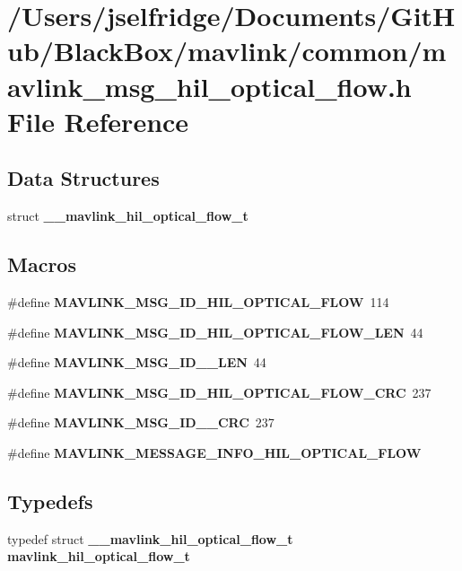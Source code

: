 \section{/\+Users/jselfridge/\+Documents/\+Git\+Hub/\+Black\+Box/mavlink/common/mavlink\+\_\+msg\+\_\+hil\+\_\+optical\+\_\+flow.h File Reference}
\label{mavlink__msg__hil__optical__flow_8h}
\subsection*{Data Structures}
\begin{DoxyCompactItemize}
\item 
struct \textbf{ \+\_\+\+\_\+mavlink\+\_\+hil\+\_\+optical\+\_\+flow\+\_\+t}
\end{DoxyCompactItemize}
\subsection*{Macros}
\begin{DoxyCompactItemize}
\item 
\#define \textbf{ M\+A\+V\+L\+I\+N\+K\+\_\+\+M\+S\+G\+\_\+\+I\+D\+\_\+\+H\+I\+L\+\_\+\+O\+P\+T\+I\+C\+A\+L\+\_\+\+F\+L\+OW}~114
\item 
\#define \textbf{ M\+A\+V\+L\+I\+N\+K\+\_\+\+M\+S\+G\+\_\+\+I\+D\+\_\+\+H\+I\+L\+\_\+\+O\+P\+T\+I\+C\+A\+L\+\_\+\+F\+L\+O\+W\+\_\+\+L\+EN}~44
\item 
\#define \textbf{ M\+A\+V\+L\+I\+N\+K\+\_\+\+M\+S\+G\+\_\+\+I\+D\+\_\+\_\+\+L\+EN}~44
\item 
\#define \textbf{ M\+A\+V\+L\+I\+N\+K\+\_\+\+M\+S\+G\+\_\+\+I\+D\+\_\+\+H\+I\+L\+\_\+\+O\+P\+T\+I\+C\+A\+L\+\_\+\+F\+L\+O\+W\+\_\+\+C\+RC}~237
\item 
\#define \textbf{ M\+A\+V\+L\+I\+N\+K\+\_\+\+M\+S\+G\+\_\+\+I\+D\+\_\+\_\+\+C\+RC}~237
\item 
\#define \textbf{ M\+A\+V\+L\+I\+N\+K\+\_\+\+M\+E\+S\+S\+A\+G\+E\+\_\+\+I\+N\+F\+O\+\_\+\+H\+I\+L\+\_\+\+O\+P\+T\+I\+C\+A\+L\+\_\+\+F\+L\+OW}
\end{DoxyCompactItemize}
\subsection*{Typedefs}
\begin{DoxyCompactItemize}
\item 
typedef struct \textbf{ \+\_\+\+\_\+mavlink\+\_\+hil\+\_\+optical\+\_\+flow\+\_\+t} \textbf{ mavlink\+\_\+hil\+\_\+optical\+\_\+flow\+\_\+t}
\end{DoxyCompactItemize}


